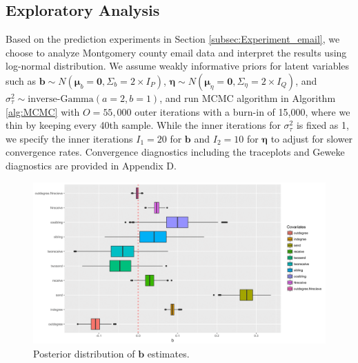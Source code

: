 \documentclass[ba]{imsart}
\numberwithin{equation}{section}
\theoremstyle{plain}
\begin{document}
	\subsection{Exploratory Analysis}\label{subsec:Result_email}
	Based on the prediction experiments in Section \ref{subsec:Experiment_email}, we choose to analyze Montgomery county email data and interpret the results using log-normal distribution. We assume weakly informative priors for latent variables such as $\boldsymbol{b}\sim N(\boldsymbol{\mu}_b=\boldsymbol{0}, \Sigma_b = 2\times I_P)$, $\boldsymbol{\eta}\sim N(\boldsymbol{\mu}_\eta=\boldsymbol{0}, \Sigma_\eta = 2\times I_Q)$, and $\sigma_\tau^2 \sim \mbox{inverse-Gamma}(a=2, b=1)$, and run MCMC algorithm in Algorithm \ref{alg:MCMC} with $O=55,000$ outer iterations with a burn-in of 15,000, where we thin by keeping every 40th sample. While the inner iterations for $\sigma_\tau^2$ is fixed as 1, we specify the inner iterations $I_1=20$ for $\boldsymbol{b}$ and $I_2=10$ for $\boldsymbol{\eta}$ to adjust for slower convergence rates. Convergence diagnostics including the traceplots and Geweke diagnostics \citep{geweke1991evaluating} are provided in Appendix D.
	\begin{figure}[!t]
		\centering
		\includegraphics[width=1\textwidth]{img/best-1.png}	
		\caption {Posterior distribution of $\boldsymbol{b}$ estimates.}
		\label{figure:betaresults}
	\end{figure}
\end{document}
